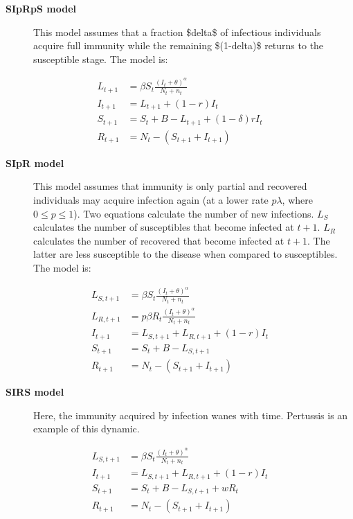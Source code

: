 \documentclass[a4paper,10pt,english]{sphinxmanual}
\begin{document}
\begin{description}
\item[{\textbf{SIpRpS model}}] \leavevmode
This model assumes that a fraction \$delta\$ of infectious individuals acquire full immunity while the remaining \$(1-delta)\$ returns to the susceptible stage. The model is:

\end{description}
\label{intromodels:equation-E:SIpRpSmodel}\begin{align}
        L_{t+1} &= \beta S_t \frac{(I_t+\theta)^\alpha} {N_t+n_t}\nonumber \\
        I_{t+1} &= L_{t+1} + (1-r)I_t\nonumber\\
        S_{t+1} &= S_t + B - L_{t+1} + (1-\delta) r I_t\nonumber\\
        R_{t+1} &= N_t-(S_{t+1}+I_{t+1})\nonumber
\end{align}\begin{description}
\item[{\textbf{SIpR model}}] \leavevmode
This model assumes that immunity is only partial and recovered individuals may acquire infection again (at a  lower rate \(p \lambda\), where \(0\leq p \leq 1\)). Two equations calculate the number of new infections. \(L_S\)  calculates the number of susceptibles that become infected at \(t+1\). \(L_R\)  calculates the number of recovered that become infected at \(t+1\). The latter are less susceptible to the disease when compared to susceptibles. The model is:

\end{description}
\label{intromodels:equation-E:SIpRmodel}\begin{align}
    L_{S,t+1} &= \beta S_t \frac{(I_t+\theta)^\alpha} {N_t+n_t}\nonumber \\
    L_{R,t+1} &= p \beta R_t \frac{(I_t+\theta)^\alpha} {N_t+n_t}\nonumber\\
    I_{t+1} &= L_{S,t+1} + L_{R,t+1} + (1-r)I_t\nonumber\\
    S_{t+1} &= S_t + B - L_{S,t+1} \nonumber\\
    R_{t+1} &= N_t-(S_{t+1}+I_{t+1}) \nonumber
    \end{align}
\begin{description}
\item[{\textbf{SIRS model}}] \leavevmode
Here, the immunity acquired by infection wanes with time. Pertussis is an example of this dynamic.

\end{description}
\label{intromodels:equation-E:SIRSmodel}\begin{align} \label{}
        L_{S,t+1} &= \beta S_t \frac{(I_t+\theta)^\alpha} {N_t+n_t}\nonumber \\
    I_{t+1} &= L_{S,t+1} + L_{R,t+1} + (1-r)I_t\nonumber\\
        S_{t+1} &= S_t + B - L_{S,t+1} + w R_t\nonumber\\
        R_{t+1} &= N_t-(S_{t+1}+I_{t+1}) \nonumber
\end{align}
\end{document}

